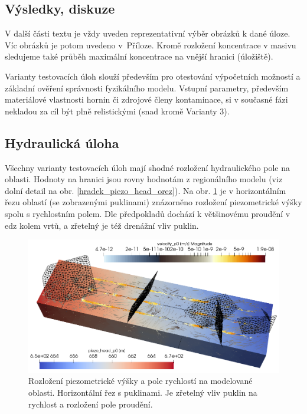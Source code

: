 \documentclass[11pt,a4paper]{article}
\begin{document}
\begin{onehalfspacing}
\newpage

\section{Výsledky, diskuze}
V další části textu je vždy uveden reprezentativní výběr obrázků k dané úloze. Víc obrázků je potom uvedeno v~Příloze. Kromě rozložení koncentrace v masivu sledujeme také průběh maximální koncentrace na vnější hranici (úložiště).

Varianty testovacích úloh slouží především pro otestování výpočetních možností a základní ověření správnosti fyzikálního modelu. Vstupní parametry, především materiálové vlastnosti hornin či zdrojové členy kontaminace, si v současné fázi nekladou za cíl být plně relistickými (snad kromě Varianty 3).

\subsection{Hydraulická úloha}
Všechny varianty testovacích úloh mají shodné rozložení hydraulického pole na oblasti. Hodnoty na hranici jsou rovny hodnotám z regionálního modelu (viz dolní detail na obr. \ref{hradek_piezo_head_orez}). Na obr. \ref{piezohead} je v horizontálním řezu oblastí (se zobrazenými puklinami) znázorněno rozložení piezometrické výšky spolu s rychlostním polem. Dle předpokladů dochází k většinovému proudění v edz kolem vrtů, a zřetelný je též drenážní vliv puklin.
\begin{figure}[H]
\centering
\includegraphics[width=16cm]{graphics/obr_ralek/hydro_s_pukl.png}
\caption{Rozložení piezometrické výšky a pole rychlostí na modelované oblasti. Horizontální řez s puklinami. Je zřetelný vliv puklin na rychlost a rozložení pole proudění.}
\label{piezohead}
\end{figure}


\end{onehalfspacing}
\end{document}
